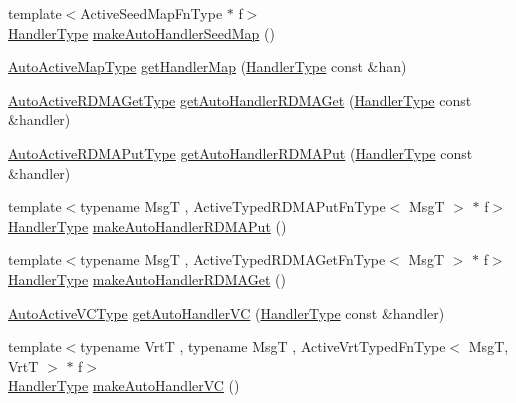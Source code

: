 \begin{DoxyCompactItemize}
{\footnotesize template$<$Active\+Seed\+Map\+Fn\+Type $\ast$ f$>$ }\\\hyperlink{namespacevt_af64846b57dfcaf104da3ef6967917573}{Handler\+Type} \hyperlink{namespacevt_1_1auto__registry_a566748acf9e0867edadcf5e556b01b00}{make\+Auto\+Handler\+Seed\+Map} ()
\item 
\hyperlink{namespacevt_1_1auto__registry_a03898a246ff1a8ce8ee4071a0391b386}{Auto\+Active\+Map\+Type} \hyperlink{namespacevt_1_1auto__registry_afd33d520084dd18da74f96012ca084b0}{get\+Handler\+Map} (\hyperlink{namespacevt_af64846b57dfcaf104da3ef6967917573}{Handler\+Type} const \&han)
\item 
\hyperlink{namespacevt_1_1auto__registry_a039813f93a5804c77ae612e0318fb335}{Auto\+Active\+R\+D\+M\+A\+Get\+Type} \hyperlink{namespacevt_1_1auto__registry_a4b0ed1bbbf713383c191339ca281cf0e}{get\+Auto\+Handler\+R\+D\+M\+A\+Get} (\hyperlink{namespacevt_af64846b57dfcaf104da3ef6967917573}{Handler\+Type} const \&handler)
\item 
\hyperlink{namespacevt_1_1auto__registry_a1f67d3efa37b61040b56258ca59df088}{Auto\+Active\+R\+D\+M\+A\+Put\+Type} \hyperlink{namespacevt_1_1auto__registry_a7028bf338698e86e44901669886e3250}{get\+Auto\+Handler\+R\+D\+M\+A\+Put} (\hyperlink{namespacevt_af64846b57dfcaf104da3ef6967917573}{Handler\+Type} const \&handler)
\item 
{\footnotesize template$<$typename MsgT , Active\+Typed\+R\+D\+M\+A\+Put\+Fn\+Type$<$ Msg\+T $>$ $\ast$ f$>$ }\\\hyperlink{namespacevt_af64846b57dfcaf104da3ef6967917573}{Handler\+Type} \hyperlink{namespacevt_1_1auto__registry_ab932bdb453695e6be54e2647dabd8c2a}{make\+Auto\+Handler\+R\+D\+M\+A\+Put} ()
\item 
{\footnotesize template$<$typename MsgT , Active\+Typed\+R\+D\+M\+A\+Get\+Fn\+Type$<$ Msg\+T $>$ $\ast$ f$>$ }\\\hyperlink{namespacevt_af64846b57dfcaf104da3ef6967917573}{Handler\+Type} \hyperlink{namespacevt_1_1auto__registry_a4ae7737d1cfa28838af83f35778dc46f}{make\+Auto\+Handler\+R\+D\+M\+A\+Get} ()
\item 
\hyperlink{namespacevt_1_1auto__registry_a4a96fdbb11b7be748365fcfc6fc46862}{Auto\+Active\+V\+C\+Type} \hyperlink{namespacevt_1_1auto__registry_a4cc84f041f735f3c7ea17e4f066d6eb1}{get\+Auto\+Handler\+VC} (\hyperlink{namespacevt_af64846b57dfcaf104da3ef6967917573}{Handler\+Type} const \&handler)
\item 
{\footnotesize template$<$typename VrtT , typename MsgT , Active\+Vrt\+Typed\+Fn\+Type$<$ Msg\+T, Vrt\+T $>$ $\ast$ f$>$ }\\\hyperlink{namespacevt_af64846b57dfcaf104da3ef6967917573}{Handler\+Type} \hyperlink{namespacevt_1_1auto__registry_a196f413473a495e5a3762d1bd95a2648}{make\+Auto\+Handler\+VC} ()
\end{DoxyCompactItemize}


